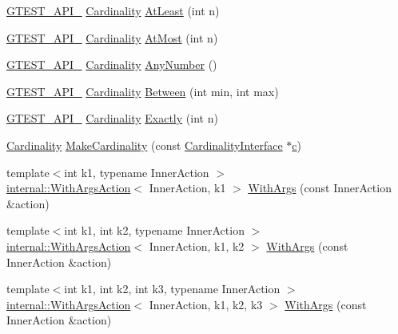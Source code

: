 \begin{DoxyCompactItemize}
\item 
\hyperlink{gtest-port_8h_aa73be6f0ba4a7456180a94904ce17790}{G\+T\+E\+S\+T\+\_\+\+A\+P\+I\+\_\+} \hyperlink{classtesting_1_1_cardinality}{Cardinality} \hyperlink{namespacetesting_a137297cb3c582843989fbd937cf0fed2}{At\+Least} (int n)
\item 
\hyperlink{gtest-port_8h_aa73be6f0ba4a7456180a94904ce17790}{G\+T\+E\+S\+T\+\_\+\+A\+P\+I\+\_\+} \hyperlink{classtesting_1_1_cardinality}{Cardinality} \hyperlink{namespacetesting_a5487cd1068c78821ced96fbf542a91bb}{At\+Most} (int n)
\item 
\hyperlink{gtest-port_8h_aa73be6f0ba4a7456180a94904ce17790}{G\+T\+E\+S\+T\+\_\+\+A\+P\+I\+\_\+} \hyperlink{classtesting_1_1_cardinality}{Cardinality} \hyperlink{namespacetesting_aa1f8a6371097e1e9b8d6866020f35252}{Any\+Number} ()
\item 
\hyperlink{gtest-port_8h_aa73be6f0ba4a7456180a94904ce17790}{G\+T\+E\+S\+T\+\_\+\+A\+P\+I\+\_\+} \hyperlink{classtesting_1_1_cardinality}{Cardinality} \hyperlink{namespacetesting_a3bb2d3cdd3fdf5b4be1480fce549918e}{Between} (int min, int max)
\item 
\hyperlink{gtest-port_8h_aa73be6f0ba4a7456180a94904ce17790}{G\+T\+E\+S\+T\+\_\+\+A\+P\+I\+\_\+} \hyperlink{classtesting_1_1_cardinality}{Cardinality} \hyperlink{namespacetesting_aa9b1b32ba9e8d3db8ac0af0fc8785c8d}{Exactly} (int n)
\item 
\hyperlink{classtesting_1_1_cardinality}{Cardinality} \hyperlink{namespacetesting_af567006969875ab70fc6aa3029576774}{Make\+Cardinality} (const \hyperlink{classtesting_1_1_cardinality_interface}{Cardinality\+Interface} $\ast$\hyperlink{jquery_8js_abce695e0af988ece0826d9ad59b8160d}{c})
\item 
{\footnotesize template$<$int k1, typename Inner\+Action $>$ }\\\hyperlink{classtesting_1_1internal_1_1_with_args_action}{internal\+::\+With\+Args\+Action}$<$ Inner\+Action, k1 $>$ \hyperlink{namespacetesting_a3bd9eef13bee9065b19d3cd571829c7c}{With\+Args} (const Inner\+Action \&action)
\item 
{\footnotesize template$<$int k1, int k2, typename Inner\+Action $>$ }\\\hyperlink{classtesting_1_1internal_1_1_with_args_action}{internal\+::\+With\+Args\+Action}$<$ Inner\+Action, k1, k2 $>$ \hyperlink{namespacetesting_aa82fc09250ba172220e6fb7e77249e74}{With\+Args} (const Inner\+Action \&action)
\item 
{\footnotesize template$<$int k1, int k2, int k3, typename Inner\+Action $>$ }\\\hyperlink{classtesting_1_1internal_1_1_with_args_action}{internal\+::\+With\+Args\+Action}$<$ Inner\+Action, k1, k2, k3 $>$ \hyperlink{namespacetesting_a999614cb785165b9a44a9a95a3753407}{With\+Args} (const Inner\+Action \&action)

\end{DoxyCompactItemize}

